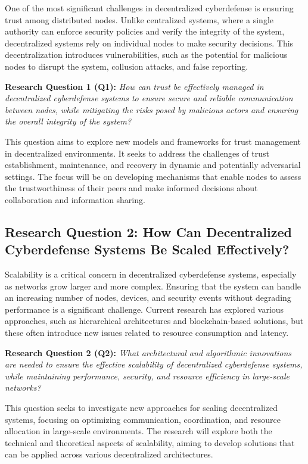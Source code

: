 One of the most significant challenges in decentralized cyberdefense is ensuring trust among distributed nodes. Unlike centralized systems, where a single authority can enforce security policies and verify the integrity of the system, decentralized systems rely on individual nodes to make security decisions. This decentralization introduces vulnerabilities, such as the potential for malicious nodes to disrupt the system, collusion attacks, and false reporting.

\textbf{Research Question 1 (Q1):} \textit{How can trust be effectively managed in decentralized cyberdefense systems to ensure secure and reliable communication between nodes, while mitigating the risks posed by malicious actors and ensuring the overall integrity of the system?}

This question aims to explore new models and frameworks for trust management in decentralized environments. It seeks to address the challenges of trust establishment, maintenance, and recovery in dynamic and potentially adversarial settings. The focus will be on developing mechanisms that enable nodes to assess the trustworthiness of their peers and make informed decisions about collaboration and information sharing.

\subsection{Research Question 2: How Can Decentralized Cyberdefense Systems Be Scaled Effectively?}

Scalability is a critical concern in decentralized cyberdefense systems, especially as networks grow larger and more complex. Ensuring that the system can handle an increasing number of nodes, devices, and security events without degrading performance is a significant challenge. Current research has explored various approaches, such as hierarchical architectures and blockchain-based solutions, but these often introduce new issues related to resource consumption and latency.

\textbf{Research Question 2 (Q2):} \textit{What architectural and algorithmic innovations are needed to ensure the effective scalability of decentralized cyberdefense systems, while maintaining performance, security, and resource efficiency in large-scale networks?}

This question seeks to investigate new approaches for scaling decentralized systems, focusing on optimizing communication, coordination, and resource allocation in large-scale environments. The research will explore both the technical and theoretical aspects of scalability, aiming to develop solutions that can be applied across various decentralized architectures.

